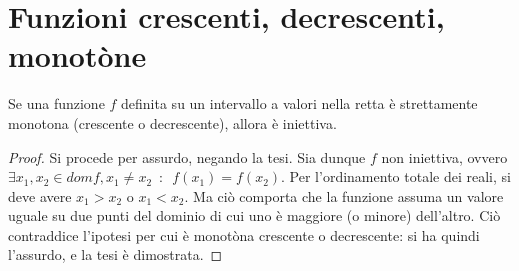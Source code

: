\documentclass[10pt, oneside]{book}
\theoremstyle{plain}
\begin{document}
\section{Funzioni crescenti, decrescenti, monotòne}
\begin{prop}
Se una funzione $f$ definita su un intervallo a valori nella retta è strettamente monotona (crescente o decrescente), allora è iniettiva.
\end{prop}
\begin{proof}
Si procede per assurdo, negando la tesi. Sia dunque $f$ non iniettiva, ovvero $\exists x_1, x_2 \in domf, x_1 \neq x_2 \enspace : \enspace f(x_1) = f(x_2)$. Per l'ordinamento totale dei reali, si deve avere $x_1 > x_2$ o $x_1 < x_2$. Ma ciò comporta che la funzione assuma un valore uguale su due punti del dominio di cui uno è maggiore (o minore) dell'altro. Ciò contraddice l'ipotesi per cui è monotòna crescente o decrescente: si ha quindi l'assurdo, e la tesi è dimostrata.
\end{proof}
\end{document}
